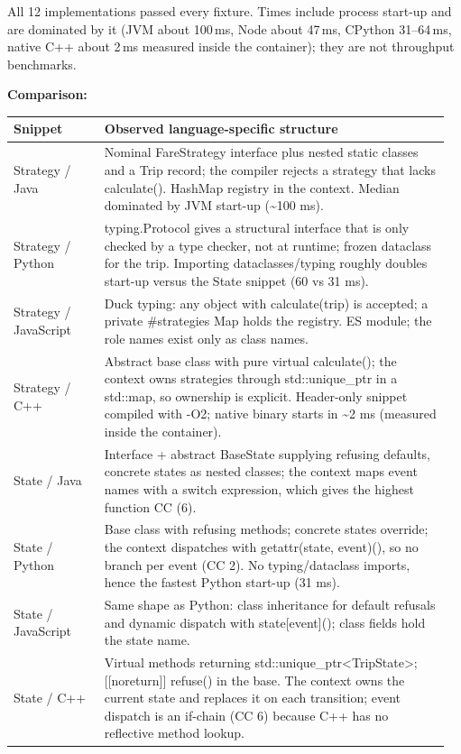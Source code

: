 \documentclass[11pt,a4paper]{article}
\begin{document}
All 12 implementations passed every fixture. Times include process start-up and are dominated by it (JVM about 100\,ms, Node about 47\,ms,
CPython 31--64\,ms, native C++ about 2\,ms measured inside the container); they are not throughput benchmarks.

\textbf{Comparison:}
\begin{longtable}{@{}P{0.2\linewidth}P{0.76\linewidth}@{}}\toprule Snippet & Observed language-specific structure\\\midrule\endhead
Strategy / Java & Nominal FareStrategy interface plus nested static classes and a Trip record; the compiler rejects a strategy that lacks calculate(). HashMap registry in the context. Median dominated by JVM start-up (\textasciitilde{}100 ms). \\
Strategy / Python & typing.Protocol gives a structural interface that is only checked by a type checker, not at runtime; frozen dataclass for the trip. Importing dataclasses/typing roughly doubles start-up versus the State snippet (60 vs 31 ms). \\
Strategy / JavaScript & Duck typing: any object with calculate(trip) is accepted; a private \#strategies Map holds the registry. ES module; the role names exist only as class names. \\
Strategy / C++ & Abstract base class with pure virtual calculate(); the context owns strategies through std::unique\_ptr in a std::map, so ownership is explicit. Header-only snippet compiled with -O2; native binary starts in \textasciitilde{}2 ms (measured inside the container). \\
State / Java & Interface + abstract BaseState supplying refusing defaults, concrete states as nested classes; the context maps event names with a switch expression, which gives the highest function CC (6). \\
State / Python & Base class with refusing methods; concrete states override; the context dispatches with getattr(state, event)(), so no branch per event (CC 2). No typing/dataclass imports, hence the fastest Python start-up (31 ms). \\
State / JavaScript & Same shape as Python: class inheritance for default refusals and dynamic dispatch with state[event](); class fields hold the state name. \\
State / C++ & Virtual methods returning std::unique\_ptr\textless{}TripState\textgreater{}; [[noreturn]] refuse() in the base. The context owns the current state and replaces it on each transition; event dispatch is an if-chain (CC 6) because C++ has no reflective method lookup. \\

\end{longtable}
\end{document}
